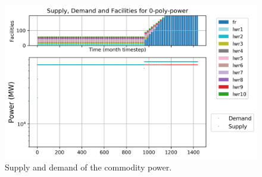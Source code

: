 \documentclass[11pt]{article}
\begin{document}
\begin{figure}[H]
	\centering
	\includegraphics[width=\textwidth]{23-figures/0-poly-power.png} 
	\hfill
	\caption{Supply and demand of the commodity power.}
	\label{fig:23-power}
\end{figure}
\end{document}
